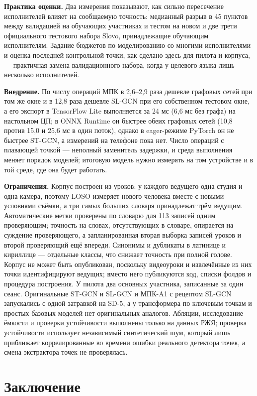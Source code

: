 \documentclass[a4paper,fleqn]{cas-dc}
\begin{document}
\textbf{Практика оценки.} Два измерения показывают, как сильно пересечение исполнителей влияет на сообщаемую точность: медианный разрыв в 45 пунктов между валидацией на обучающих участниках и тестом на новом и две трети официального тестового набора Slovo, принадлежащие обучающим исполнителям. Задание бюджетов по моделированию со многими исполнителями и оценка последней контрольной точки, как сделано здесь для пилота и корпуса, --- практичная замена валидационного набора, когда у целевого языка лишь несколько исполнителей.

\textbf{Внедрение.} По числу операций МПК в 2,6--2,9 раза дешевле графовых сетей при том же окне и в 12,8 раза дешевле SL-GCN при его собственном тестовом окне, а его экспорт в TensorFlow Lite выполняется за 24 мс (6,6 мс без графа) на настольном ЦП; в ONNX Runtime он быстрее обеих графовых сетей (10,8 против 15,0 и 25,6 мс в один поток), однако в eager-режиме PyTorch он не быстрее ST-GCN, а измерений на телефоне пока нет. Число операций с плавающей точкой --- неполный заменитель задержки, и среда выполнения меняет порядок моделей; итоговую модель нужно измерять на том устройстве и в той среде, где она будет работать.

\textbf{Ограничения.} Корпус построен из уроков: у каждого ведущего одна студия и одна камера, поэтому LOSO измеряет нового человека вместе с новыми условиями съёмки, а три самых больших словаря принадлежат трём ведущим. Автоматические метки проверены по словарю для 113 записей одним проверяющим; точность на словах, отсутствующих в словаре, опирается на суждение проверяющего, а запланированная вторая выборка записей уроков и второй проверяющий ещё впереди. Синонимы и дубликаты в латинице и кириллице --- отдельные классы, что снижает точность при полной голове. Корпус не может быть опубликован, поскольку видеоуроки и извлечённые из них точки идентифицируют ведущих; вместо него публикуются код, списки фолдов и процедура построения. У пилота два основных участника, записанные за один сеанс. Оригинальные ST-GCN и SL-GCN и МПК-A1 с рецептом SL-GCN запускались с одной затравкой на SD-5, а у трансформера по ключевым точкам и простых базовых моделей нет оригинальных аналогов. Абляции, исследование ёмкости и проверки устойчивости выполнены только на данных РЖЯ; проверка устойчивости использует независимый синтетический шум, который лишь приближает коррелированные во времени ошибки реального детектора точек, а смена экстрактора точек не проверялась.

\hypertarget{ux437ux430ux43aux43bux44eux447ux435ux43dux438ux435}{%
\section{Заключение}\label{ux437ux430ux43aux43bux44eux447ux435ux43dux438ux435}}
\end{document}
